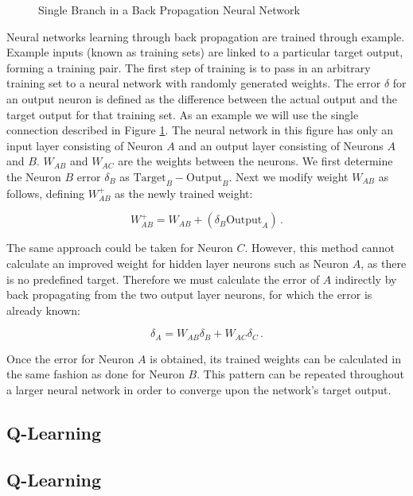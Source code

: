 \begin{figure}[ht]
	\centering
	
	\caption{Single Branch in a Back Propagation Neural Network}
	\label{fig:backprop}
\end{figure}

Neural networks learning through back propagation are trained through example.  Example inputs (known as training sets) are linked to a particular target output, forming a training pair.  The first step of training is to pass in an arbitrary training set to a neural network with randomly generated weights.  The error $\delta$ for an output neuron is defined as the difference between the actual output and the target output for that training set. As an example we will use the single connection described in Figure \ref{fig:backprop}. The neural network in this figure has only an input layer consisting of Neuron $A$ and an output layer consisting of Neurons $A$ and $B$. $W_{AB}$  and $W_{AC}$ are the weights between the neurons. We first determine the Neuron $B$ error $\delta_B$ as $\text{Target}_B - \text{Output}_B$.   Next we modify weight $W_{AB}$ as follows, defining $W_{AB}^{+}$ as the newly trained weight:

\begin{equation}
	W_{AB}^{+} = W_{AB} + (\delta_B \text{Output}_A)\,.
\end{equation}

The same approach could be taken for Neuron $C$.  However, this method cannot calculate an improved weight for hidden layer neurons such as Neuron $A$, as there is no predefined target.  Therefore we must calculate the error of $A$ indirectly by back propagating from the two output layer neurons, for which the error is already known:

\begin{equation}
	\delta_A = W_{AB}\delta_B + W_{AC}\delta_C \,.
\end{equation}

Once the error for Neuron $A$ is obtained, its trained weights can be calculated in the same fashion as done for Neuron $B$.  This pattern can be repeated throughout a larger neural network in order to converge upon the network's target output.

\subsection{Q-Learning}

\subsection{Q-Learning}

